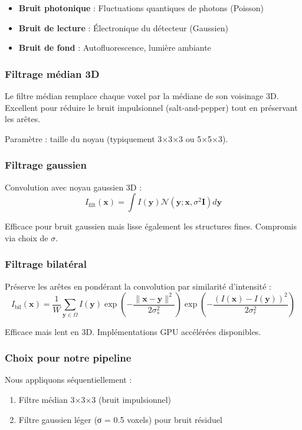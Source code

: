 \begin{itemize}
    \item \textbf{Bruit photonique} : Fluctuations quantiques de photons (Poisson)
    \item \textbf{Bruit de lecture} : Électronique du détecteur (Gaussien)
    \item \textbf{Bruit de fond} : Autofluorescence, lumière ambiante
\end{itemize}

\subsubsection{Filtrage médian 3D}

Le filtre médian remplace chaque voxel par la médiane de son voisinage 3D. Excellent pour réduire le bruit impulsionnel (salt-and-pepper) tout en préservant les arêtes.

Paramètre : taille du noyau (typiquement 3×3×3 ou 5×5×3).

\subsubsection{Filtrage gaussien}

Convolution avec noyau gaussien 3D :
\[
I_{\text{filt}}(\mathbf{x}) = \int I(\mathbf{y}) \mathcal{N}(\mathbf{y}; \mathbf{x}, \sigma^2 \mathbf{I}) d\mathbf{y}
\]

Efficace pour bruit gaussien mais lisse également les structures fines. Compromis via choix de $\sigma$.

\subsubsection{Filtrage bilatéral}

Préserve les arêtes en pondérant la convolution par similarité d'intensité :
\[
I_{\text{bil}}(\mathbf{x}) = \frac{1}{W}\sum_{\mathbf{y} \in \Omega} I(\mathbf{y}) \exp\left(-\frac{\|\mathbf{x}-\mathbf{y}\|^2}{2\sigma_s^2}\right) \exp\left(-\frac{(I(\mathbf{x})-I(\mathbf{y}))^2}{2\sigma_r^2}\right)
\]

Efficace mais lent en 3D. Implémentations GPU accélérées disponibles.

\subsubsection{Choix pour notre pipeline}

Nous appliquons séquentiellement :
\begin{enumerate}
    \item Filtre médian 3×3×3 (bruit impulsionnel)
    \item Filtre gaussien léger (σ = 0.5 voxels) pour bruit résiduel
\end{enumerate}

